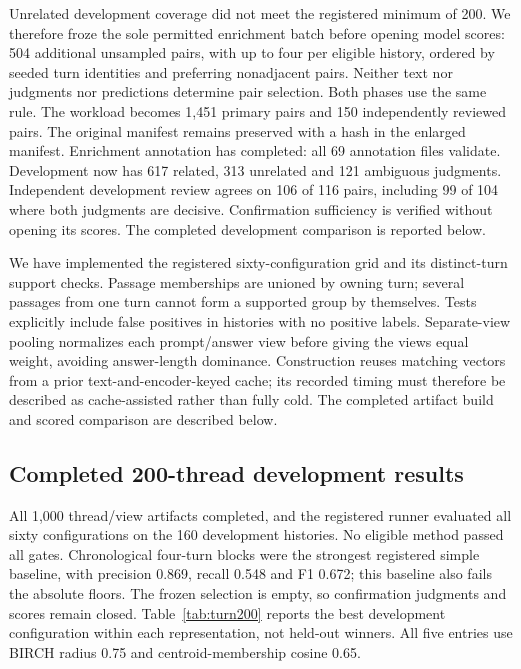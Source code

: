 \documentclass[11pt]{article}
\begin{document}
Unrelated development coverage did not meet the registered minimum of 200. We
therefore froze the sole permitted enrichment batch before opening model scores:
504 additional unsampled pairs, with up to four per eligible history, ordered
by seeded turn identities and preferring nonadjacent pairs. Neither text nor
judgments nor predictions determine pair selection. Both phases use the same
rule. The workload becomes 1,451 primary pairs and 150 independently reviewed
pairs. The original manifest remains preserved with a hash in the enlarged
manifest. Enrichment annotation has completed: all 69 annotation files validate.
Development now has 617 related, 313 unrelated and 121 ambiguous judgments.
Independent development review agrees on 106 of 116 pairs, including 99 of 104
where both judgments are decisive. Confirmation sufficiency is verified without
opening its scores. The completed development comparison is reported below.

We have implemented the registered sixty-configuration grid and its
distinct-turn support checks. Passage memberships are unioned by owning turn;
several passages from one turn cannot form a supported group by themselves.
Tests explicitly include false positives in histories with no positive labels.
Separate-view pooling normalizes each prompt/answer view before giving the
views equal weight, avoiding answer-length dominance. Construction reuses
matching vectors from a prior text-and-encoder-keyed cache; its recorded timing
must therefore be described as cache-assisted rather than fully cold. The
completed artifact build and scored comparison are described below.

\subsection{Completed 200-thread development results}
All 1,000 thread/view artifacts completed, and the registered runner evaluated
all sixty configurations on the 160 development histories. No eligible method
passed all gates. Chronological four-turn blocks were the strongest registered
simple baseline, with precision 0.869, recall 0.548 and F1 0.672; this baseline
also fails the absolute floors. The frozen selection is empty, so confirmation
judgments and scores remain closed. Table~\ref{tab:turn200} reports the best
development configuration within each representation, not held-out winners.
All five entries use BIRCH radius 0.75 and centroid-membership cosine 0.65.
\end{document}
